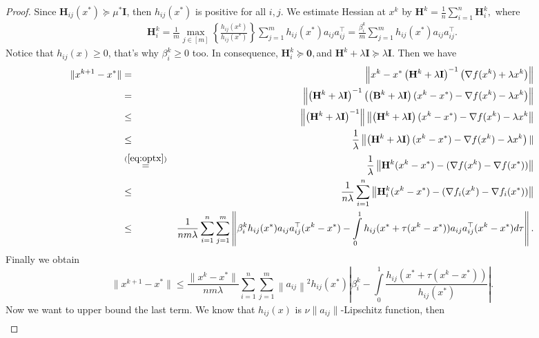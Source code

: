 \documentclass[10pt]{article}
\newcommand{\newalpha}{h}
\newcommand{\mH}{\mathbf{H}}
\newcommand{\mI}{\mathbf{I}}
\begin{document}
\begin{proof}
	Since $\mH_{ij}(x^*) \succeq \mu^*\mI$, then $\newalpha_{ij}(x^*)$ is positive for all $i,j$. We estimate Hessian at $x^k$ by $\mH^k = \frac{1}{n}\sum\limits_{i=1}^n\mH_i^k,$ where 
	\begin{eqnarray*}
		\mH_i^k = \frac{1}{m}\max_{j \in [m]}\left\{\frac{\newalpha_{ij}(x^k)}{\newalpha_{ij}(x^*)}\right\}\sum\limits_{j=1}^m\newalpha_{ij}(x^*)a_{ij}a_{ij}^\top = \frac{\beta^k_i}{m}\sum\limits_{j=1}^m\newalpha_{ij}(x^*)a_{ij}a_{ij}^\top. 
	\end{eqnarray*}
	Notice that $h_{ij}(x) \geq 0$, that's why $\beta_i^k \geq 0$ too. In consequence, $\mH_i^k \succeq \mathbf{0}, $and $\mH^k+\lambda\mI  \succeq \lambda\mI$. Then we have
	\begin{eqnarray*}
		\|x^{k+1}-x^*\| & = & \left\|x^k-x^*\left(\mH^k+\lambda\mI\right)^{-1}\left(\nabla f(x^k) + \lambda x^k\right)\right\|\\
		&=&\left\|\left(\mH^k+\lambda\mI\right)^{-1}\left(\left(\mathbf{B}^k+\lambda\mathbf{I}\right)(x^k-x^*)-\nabla f(x^k) - \lambda x^k\right)\right\|\\
		&\leq & \left\|\left(\mH^k+\lambda\mI\right)^{-1}\right\|\left\|\left(\mH^k+\lambda\mI\right)(x^k-x^*)-\nabla f(x^k) - \lambda x^k\right\|\\
		&\leq & \frac{1}{\lambda}\left\|\left(\mH^k+\lambda\mI\right)(x^k-x^*)-\nabla f(x^k) - \lambda x^k\right)\|\\
		&\overset{(\ref{eq:optx})}{=}& \frac{1}{\lambda}\left\|\mH^k(x^k-x^*) - (\nabla f(x^k) -\nabla f(x^*))\right\| \\
		&\leq&\frac{1}{n\lambda}\sum\limits_{i=1}^n\left\|\mH_i^k(x^k-x^*) -(\nabla f_i(x^k) - \nabla f_i(x^*))\right\|\\
		&\leq&\frac{1}{nm\lambda}\sum\limits_{i=1}^n\sum\limits_{j=1}^m\left\|\beta_i^k\newalpha_{ij}(x^*)a_{ij}a_{ij}^\top(x^k-x^*) - \int\limits_0^1\newalpha_{ij}(x^*+\tau(x^k-x^*))a_{ij}a_{ij}^\top(x^k-x^*) d\tau\right\|.
	\end{eqnarray*}
	Finally we obtain
	\begin{equation}
		\label{originalmaxnewton1}
		\|x^{k+1}-x^*\| \leq  \frac{\|x^k-x^*\|}{nm\lambda}\sum\limits_{i=1}^n\sum\limits_{j=1}^m\left\|a_{ij}\right\|^2\newalpha_{ij}(x^*)\left|\beta_i^k-\int\limits_0^1\frac{\newalpha_{ij}(x^*+\tau(x^k-x^*))}{\newalpha_{ij}(x^*)}\right|.
	\end{equation}
	Now we want to upper bound the last term. We know that $\newalpha_{ij}(x)$ is $\nu\|a_{ij}\|$-Lipschitz function, then \begin{eqnarray*}

\end{eqnarray*}
\end{proof}
\end{document}

